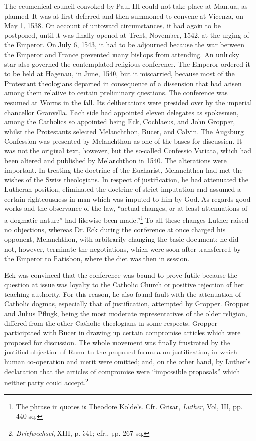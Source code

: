 The ecumenical council convoked by Paul III could not take place
at Mantua, as planned. It was at first deferred and then summoned
to convene at Vicenza, on May 1, 1538. On account of untoward
circumstances, it had again to be postponed, until it was finally opened
at Trent, November, 1542, at the urging of the Emperor. On July 6,
1543, it had to be adjourned because the war between the Emperor
and France prevented many bishops from attending.
An unlucky star also governed the contemplated religious conference. The
Emperor ordered it to be held at Hagenau, in June,
1540, but it miscarried, because most of the Protestant theologians
departed in consequence of a dissension that had arisen among them
relative to certain preliminary questions. The conference was resumed
at Worms in the fall. Its deliberations were presided over by the imperial
chancellor Granvella. Each side had appointed eleven delegates
as spokesmen, among the Catholics so appointed being Eck, Cochlaeus,
and John Gropper, whilst the Protestants selected Melanchthon,
Bucer, and Calvin. The Augsburg Confession was presented by Melanchthon
as one of the bases for discussion. It was not the original
text, however, but the so-called Confessio Variata, which had been
altered and published by Melanchthon in 1540. The alterations were
important. In treating the doctrine of the Eucharist, Melanchthon
had met the wishes of the Swiss theologians. In respect of justification,
he had attenuated the Lutheran position, eliminated the doctrine of
strict imputation and assumed a certain righteousness in man which
was imputed to him by God. As regards good works and the observance of
the law, “actual changes, or at least attenuations of a
dogmatic nature” had likewise been made.”\footnote{The phrase in quotes is Theodore Kolde’s. Cfr. Grisar, \textit{Luther}, Vol, III, pp. 440 sq.}
 To all these changes
Luther raised no objections, whereas Dr. Eck during the conference
at once charged his opponent, Melanchthon, with arbitrarily changing the
basic document; he did not, however, terminate the negotiations,
which were soon after transferred by the Emperor to Ratisbon,
where the diet was then in session.

Eck was convinced that the conference was bound to prove futile
because the question at issue was loyalty to the Catholic Church or
positive rejection of her teaching authority. For this reason, he also
found fault with the attenuation of Catholic dogmas, especially that
of justification, attempted by Gropper. Gropper and Julius Pflugk,
being the most moderate representatives of the older religion, differed
from the other Catholic theologians in some respects. Gropper participated
with Bucer in drawing up certain compromise articles which
were proposed for discussion. The whole movement was finally frustrated
by the justified objection of Rome to the proposed formula on
justification, in which human co-operation and merit were omitted;
and, on the other hand, by Luther’s declaration that the articles of
compromise were “impossible proposals” which neither party could
accept.\footnote{\textit{Briefwechsel}, XIII, p. 341; cfr., pp. 267 sq.}

